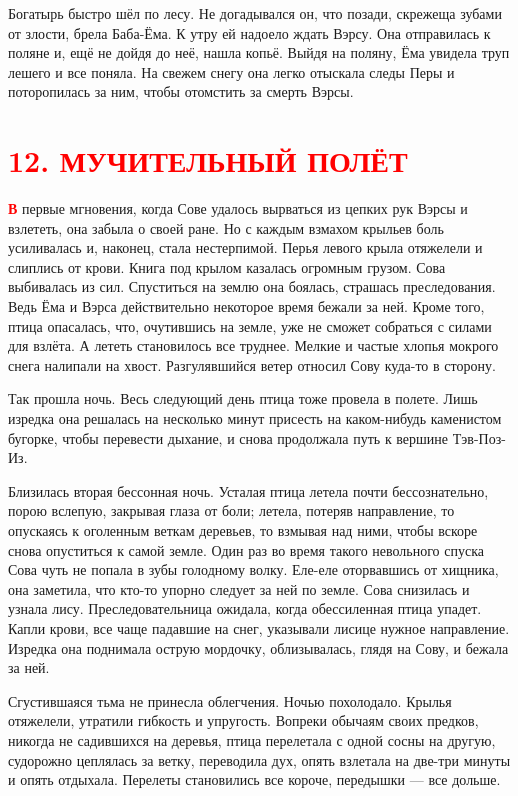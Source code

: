 \documentclass[oneside,final,14pt]{extreport}
\begin{document}
	Богатырь быстро шёл по лесу. Не догадывался он, что позади, скрежеща зубами от злости, брела Баба-Ёма. К утру ей надоело ждать Вэрсу. Она отправилась к поляне и, ещё не дойдя до неё, нашла копьё. Выйдя на поляну, Ёма увидела труп лешего и все поняла. На свежем снегу она легко отыскала следы Перы и поторопилась за ним, чтобы отомстить за смерть Вэрсы.
	
	
		\section[12. Мучительный полёт]{\center \textcolor{red}{12. МУЧИТЕЛЬНЫЙ ПОЛЁТ}}
	
	
	\lettrine[findent=0pt]{\textbf{\textcolor{red}{В}}}{} первые мгновения, когда Сове удалось вырваться из цепких рук Вэрсы и взлететь, она забыла о своей ране. Но с каждым взмахом крыльев боль усиливалась и, наконец, стала нестерпимой. Перья левого крыла отяжелели и слиплись от крови. Книга под крылом казалась огромным грузом. Сова выбивалась из сил. Спуститься на землю она боялась, страшась преследования. Ведь Ёма и Вэрса действительно некоторое время бежали за ней. Кроме того, птица опасалась, что, очутившись на земле, уже не сможет собраться с силами для взлёта. А лететь становилось все труднее. Мелкие и частые хлопья мокрого снега налипали на хвост. Разгулявшийся ветер относил Сову куда-то в сторону.
	
	Так прошла ночь. Весь следующий день птица тоже провела в полете. Лишь изредка она решалась на несколько минут присесть на каком-нибудь каменистом бугорке, чтобы перевести дыхание, и снова продолжала путь к вершине Тэв-Поз-Из.
	
	Близилась вторая бессонная ночь. Усталая птица летела почти бессознательно, порою вслепую, закрывая глаза от боли; летела, потеряв направление, то опускаясь к оголенным веткам деревьев, то взмывая над ними, чтобы вскоре снова опуститься к самой земле. Один раз во время такого невольного спуска Сова чуть не попала в зубы голодному волку. Еле-еле оторвавшись от хищника, она заметила, что кто-то упорно следует за ней по земле. Сова снизилась и узнала лису. Преследовательница ожидала, когда обессиленная птица упадет. Капли крови, все чаще падавшие на снег, указывали лисице нужное направление. Изредка она поднимала острую мордочку, облизывалась, глядя на Сову, и бежала за ней.
	
	Сгустившаяся тьма не принесла облегчения. Ночью похолодало. Крылья отяжелели, утратили гибкость и упругость. Вопреки обычаям своих предков, никогда не садившихся на деревья, птица перелетала с одной сосны на другую, судорожно цеплялась за ветку, переводила дух, опять взлетала на две-три минуты и опять отдыхала. Перелеты становились все короче, передышки — все дольше.
	
\end{document}
